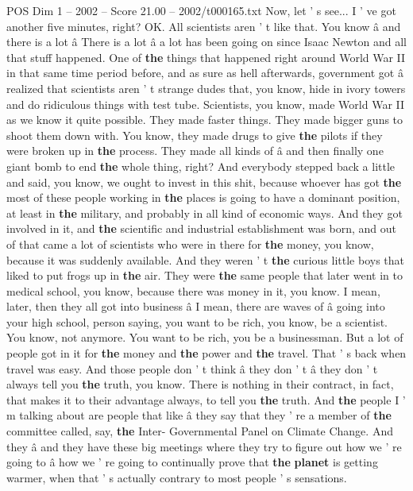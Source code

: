 \begin{textsample}{POS Dim 1 – 2002 – Score 21.00 – 2002/t000165.txt}
Now, let ' s see...
I ' ve got another five minutes, right?
OK.
All scientists aren ' t like that.
You know â and there is a lot â There is a lot â a lot has been going on since Isaac Newton and all that stuff happened.
One of \textbf{the} things that happened right around World War II in that same time period before, and as sure as hell afterwards, government got â realized that scientists aren ' t strange dudes that, you know, hide in ivory towers and do ridiculous things with test tube.
Scientists, you know, made World War II as we know it quite possible.
They made faster things.
They made bigger guns to shoot them down with.
You know, they made drugs to give \textbf{the} pilots if they were broken up in \textbf{the} process.
They made all kinds of â and then finally one giant bomb to end \textbf{the} whole thing, right?
And everybody stepped back a little and said, you know, we ought to invest in this shit, because whoever has got \textbf{the} most of these people working in \textbf{the} places is going to have a dominant position, at least in \textbf{the} military, and probably in all kind of economic ways.
And they got involved in it, and \textbf{the} scientific and industrial establishment was born, and out of that came a lot of scientists who were in there for \textbf{the} money, you know, because it was suddenly available.
And they weren ' t \textbf{the} curious little boys that liked to put frogs up in \textbf{the} air.
They were \textbf{the} same people that later went in to medical school, you know, because there was money in it, you know.
I mean, later, then they all got into business â I mean, there are waves of â going into your high school, person saying, you want to be rich, you know, be a scientist.
You know, not anymore.
You want to be rich, you be a businessman.
But a lot of people got in it for \textbf{the} money and \textbf{the} power and \textbf{the} travel.
That ' s back when travel was easy.
And those people don ' t think â they don ' t â they don ' t always tell you \textbf{the} truth, you know.
There is nothing in their contract, in fact, that makes it to their advantage always, to tell you \textbf{the} truth.
And \textbf{the} people I ' m talking about are people that like â they say that they ' re a member of \textbf{the} committee called, say, \textbf{the} Inter- Governmental Panel on Climate Change.
And they â and they have these big meetings where they try to figure out how we ' re going to â how we ' re going to continually prove that \textbf{the} \textbf{planet} is getting warmer, when that ' s actually contrary to most people ' s sensations.

\end{textsample}
